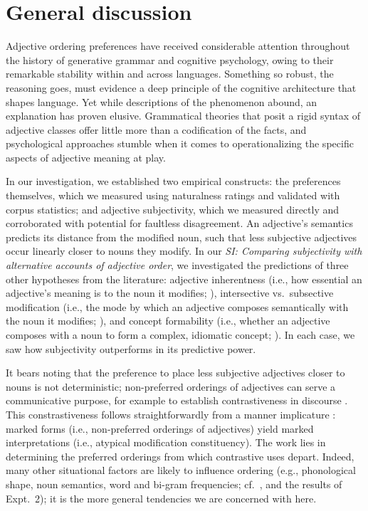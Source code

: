 \documentclass[12pt]{article}
\begin{document}

\section{General discussion}

Adjective ordering preferences have received considerable attention throughout the history of generative grammar and cognitive psychology, owing to their remarkable stability within and across languages. Something so robust, the reasoning goes, must evidence a deep principle of the cognitive architecture that shapes language. Yet while descriptions of the phenomenon abound, an explanation has proven elusive. Grammatical theories that posit a rigid syntax of adjective classes offer little more than a codification of the facts, and psychological approaches stumble when it comes to operationalizing the specific aspects of adjective meaning at play. 

In our investigation, we established two empirical constructs: the preferences themselves, which we measured using naturalness ratings and validated with corpus statistics; and adjective subjectivity, which we measured directly and corroborated with potential for faultless disagreement. 
An adjective's semantics predicts its distance from the modified noun, such that less subjective adjectives occur linearly closer to nouns they modify. In our \textit{SI: Comparing subjectivity with alternative accounts of adjective order}, we investigated the predictions of three other hypotheses from the literature: adjective inherentness (i.e., how essential an adjective's meaning is to the noun it modifies; \citealp{sweet1898,whorf1945}), intersective vs.~subsective modification (i.e., the mode by which an adjective composes semantically with the noun it modifies; \citealp{truswell2009}), and concept formability (i.e., whether an adjective composes with a noun to form a complex, idiomatic concept; \citealp{McNally2004,bouchard2005,svenonius2008}). In each case, we saw how subjectivity outperforms in its predictive power.

It bears noting that the preference to place less subjective adjectives closer to nouns is not deterministic; non-preferred orderings of adjectives can serve a communicative purpose, for example to establish contrastiveness in discourse \citep{martin1969,Martin1970,Hill1958,vendler1963}. This constrastiveness follows straightforwardly from a manner implicature \citep{levinson2000}: marked forms (i.e., non-preferred orderings of adjectives) yield marked interpretations (i.e., atypical modification constituency). The work lies in determining the preferred orderings from which  contrastive uses depart. Indeed, many other situational factors are likely to influence ordering (e.g., phonological shape, noun semantics, word and bi-gram frequencies; cf.~\citealp{wulff2003}, and the results of Expt.~2); it is the more general tendencies we are concerned with here.
\end{document}
